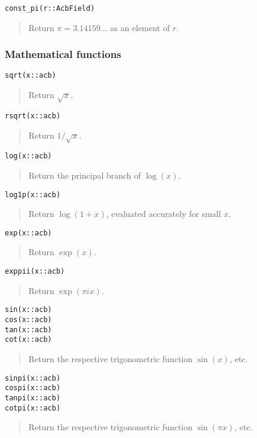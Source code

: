\documentclass[a4paper,10pt]{article}
\newcommand{\desc}[1]{\vspace{-3mm}\begin{quote}#1\end{quote}}
\begin{document}
{{\begin{lstlisting}
const_pi(r::AcbField)
\end{lstlisting}

\desc{Return $\pi = 3.14159\ldots$ as an element of $r$.}

\subsubsection{Mathematical functions}

\begin{lstlisting}
sqrt(x::acb)
\end{lstlisting}

\desc{Return $\sqrt{x}$.}

\begin{lstlisting}
rsqrt(x::acb)
\end{lstlisting}

\desc{Return $1 / \sqrt{x}$.}

\begin{lstlisting}
log(x::acb)
\end{lstlisting}

\desc{Return the principal branch of $\log(x)$.}

\begin{lstlisting}
log1p(x::acb)
\end{lstlisting}

\desc{Return $\log(1+x)$, evaluated accurately for small $x$.}

\begin{lstlisting}
exp(x::acb)
\end{lstlisting}

\desc{Return $\exp(x)$.}

\begin{lstlisting}
exppii(x::acb)
\end{lstlisting}

\desc{Return $\exp(\pi i x)$.}

\begin{lstlisting}
sin(x::acb)
cos(x::acb)
tan(x::acb)
cot(x::acb)
\end{lstlisting}

\desc{Return the respective trigonometric function $\sin(x)$, etc.}

\begin{lstlisting}
sinpi(x::acb)
cospi(x::acb)
tanpi(x::acb)
cotpi(x::acb)
\end{lstlisting}

\desc{Return the respective trigonometric function $\sin(\pi x)$, etc.}

}}
\end{document}
